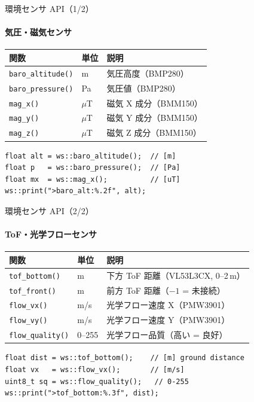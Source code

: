 \documentclass[aspectratio=169, 14pt]{beamer}
\begin{document}
\begin{frame}[fragile]{環境センサ API（1/2）}
  \framesubtitle{気圧・磁気センサ}
  {\small
  \begin{tabular}{lll}
    \hline
    \textbf{関数} & \textbf{単位} & \textbf{説明} \\
    \hline
    \texttt{baro\_altitude()} & m   & 気圧高度（BMP280） \\
    \texttt{baro\_pressure()} & Pa  & 気圧値（BMP280） \\
    \texttt{mag\_x()}         & $\mu$T & 磁気 X 成分（BMM150） \\
    \texttt{mag\_y()}         & $\mu$T & 磁気 Y 成分（BMM150） \\
    \texttt{mag\_z()}         & $\mu$T & 磁気 Z 成分（BMM150） \\
    \hline
  \end{tabular}
  }

  \vspace{0.3em}

  \begin{lstlisting}[style=sfcpp, basicstyle=\ttfamily\scriptsize]
float alt = ws::baro_altitude();  // [m]
float p   = ws::baro_pressure();  // [Pa]
float mx  = ws::mag_x();          // [uT]
ws::print(">baro_alt:%.2f", alt);
  \end{lstlisting}
\end{frame}

\begin{frame}[fragile]{環境センサ API（2/2）}
  \framesubtitle{ToF・光学フローセンサ}
  {\small
  \begin{tabular}{lll}
    \hline
    \textbf{関数} & \textbf{単位} & \textbf{説明} \\
    \hline
    \texttt{tof\_bottom()}   & m     & 下方 ToF 距離（VL53L3CX, 0--2\,m） \\
    \texttt{tof\_front()}    & m     & 前方 ToF 距離（$-1$ = 未接続） \\
    \texttt{flow\_vx()}      & m/s   & 光学フロー速度 X（PMW3901） \\
    \texttt{flow\_vy()}      & m/s   & 光学フロー速度 Y（PMW3901） \\
    \texttt{flow\_quality()} & 0--255 & 光学フロー品質（高い = 良好） \\
    \hline
  \end{tabular}
  }

  \vspace{0.3em}

  \begin{lstlisting}[style=sfcpp, basicstyle=\ttfamily\scriptsize]
float dist = ws::tof_bottom();    // [m] ground distance
float vx   = ws::flow_vx();       // [m/s]
uint8_t sq = ws::flow_quality();   // 0-255
ws::print(">tof_bottom:%.3f", dist);
  \end{lstlisting}
\end{frame}
\end{document}
